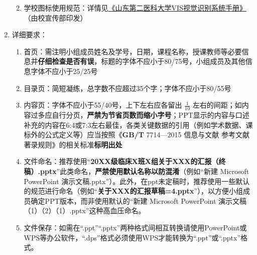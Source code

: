 \begin{enumerate}
\begin{enumerate}
                  \item 学校图标使用规范：详情见\uline{\href{https://www.wfmc.edu.cn/4229/list.htm}{《山东第二医科大学VIS视觉识别系统手册》}}（由校宣传部印发）
            \end{enumerate}
      \item 详细要求：
            \begin{enumerate}
                  \item 首页：需注明小组成员姓名及学号，日期，课程名称，授课教师等必要信息并\textbf{仔细检查是否有误}，标题的字体不应小于80/75号，小组成员及其他信息字体不应小于25/25号
                  \item 目录页：简短凝练，总字数不应超过35个字；字体不应小于80/55号
                  \item 内容页：字体不应小于55/40号，上下左右应各留出 $\frac{1}{10}$ 左右的间距；如内容过多应自行分页，\textbf{严禁为节省页数而缩小字号}；PPT显示的内容与口述补充的内容在6:4或7:3左右最佳，各类关键数据的引用（例如学术数据、课标外的公式定义等）应当按照\linebreak[3]《\textbf{GB/T} 7714—2015 信息与文献 参考文献著录规则》的相关标准\textbf{标明出处}
                  \item 文件命名\footnotemark：推荐使用“\textbf{20XX级临床X班X组关于XXX的汇报（终稿）.pptx}”此类命名，\textbf{严禁使用默认名称以防混淆}（例如“新建 Microsoft PowerPoint 演示文稿.pptx”）。此外，在ppt未定稿时，推荐使用一些默认的规范进行命名（例如“\textbf{关于XXX的汇报草稿=4.pptx}”），以方便小组成员确定PPT版本，而非使用默认的“新建 Microsoft PowerPoint 演示文稿（1）（2）（1）.pptx”这种高血压命名。
                  \item 文件保存\footnotemark：如需在“.ppt”“.pptx”两种格式间相互转换请使用PowerPoint或WPS等办公软件，“.dps”格式必须使用WPS才能转换为“.ppt”或“.pptx”格式。
            \end{enumerate}

\end{enumerate}

